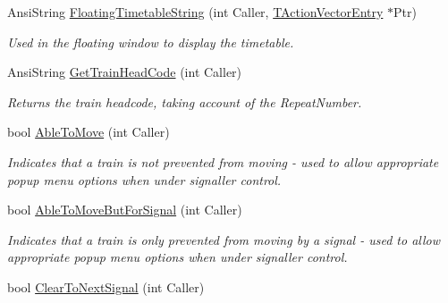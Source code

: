 \begin{DoxyCompactItemize}
\mbox{\label{class_t_train_a81bf61b47a2867f0c6901b1ea6f47177}} 
Ansi\+String \mbox{\hyperlink{class_t_train_a81bf61b47a2867f0c6901b1ea6f47177}{Floating\+Timetable\+String}} (int Caller, \mbox{\hyperlink{class_t_action_vector_entry}{T\+Action\+Vector\+Entry}} $\ast$Ptr)
\begin{DoxyCompactList}\small\item\em Used in the floating window to display the timetable. \end{DoxyCompactList}\item 
\mbox{\label{class_t_train_a63b0884e315178879369c82ee7fd2cb8}} 
Ansi\+String \mbox{\hyperlink{class_t_train_a63b0884e315178879369c82ee7fd2cb8}{Get\+Train\+Head\+Code}} (int Caller)
\begin{DoxyCompactList}\small\item\em Returns the train headcode, taking account of the Repeat\+Number. \end{DoxyCompactList}\item 
\mbox{\label{class_t_train_a659e6bf818f0cfac38728d4748408ee6}} 
bool \mbox{\hyperlink{class_t_train_a659e6bf818f0cfac38728d4748408ee6}{Able\+To\+Move}} (int Caller)
\begin{DoxyCompactList}\small\item\em Indicates that a train is not prevented from moving -\/ used to allow appropriate popup menu options when under signaller control. \end{DoxyCompactList}\item 
\mbox{\label{class_t_train_ab4f992b2aeb186f8d23879d9405296a3}} 
bool \mbox{\hyperlink{class_t_train_ab4f992b2aeb186f8d23879d9405296a3}{Able\+To\+Move\+But\+For\+Signal}} (int Caller)
\begin{DoxyCompactList}\small\item\em Indicates that a train is only prevented from moving by a signal -\/ used to allow appropriate popup menu options when under signaller control. \end{DoxyCompactList}\item 
bool \mbox{\hyperlink{class_t_train_aeed1f50d8a4f76d7d77991d276758570}{Clear\+To\+Next\+Signal}} (int Caller)
\item 
\mbox{\label{class_t_train_a935bb43db57a3f2b635be9dfc6a7988b}} 

\end{DoxyCompactItemize}
